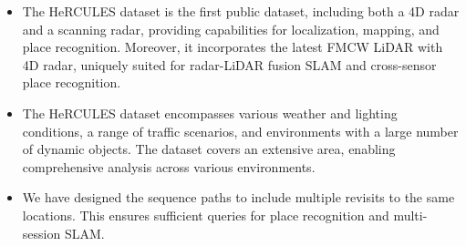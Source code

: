 




\begin{itemize}
    \item The HeRCULES dataset is the first public dataset, including both a 4D radar and a scanning radar, providing capabilities for localization, mapping, and place recognition. Moreover, it incorporates the latest FMCW LiDAR with 4D radar, uniquely suited for radar-LiDAR fusion SLAM and cross-sensor place recognition. 
\end{itemize}


\begin{itemize}
    \item The HeRCULES dataset encompasses various weather and lighting conditions, a range of traffic scenarios, and environments with a large number of dynamic objects. The dataset covers an extensive area, enabling comprehensive analysis across various environments.
\end{itemize}

\begin{itemize}
    \item We have designed the sequence paths to include multiple revisits to the same locations. This ensures sufficient queries for place recognition and multi-session \ac{SLAM}.
\end{itemize}

